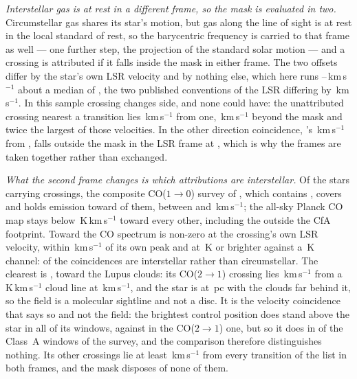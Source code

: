 \emph{Interstellar gas is at rest in a different frame, so the mask is
evaluated in two.} Circumstellar gas shares its star's motion, but gas along
the line of sight is at rest in the local standard of rest, so the
barycentric frequency is carried to that frame as well --- one further step,
the projection of the standard solar motion --- and a crossing is attributed
if it falls inside the mask in either frame. The two offsets differ by the
star's own LSR velocity and by nothing else, which here runs
\LsVLsrLo--\LsVLsrHi\,km\,s$^{-1}$ about a median of \LsVLsrMed, the two
published conventions of the LSR differing by \LsConvKms\,km\,s$^{-1}$.
In this sample \LsNMoveWord{} crossing changes side, and none could have: the unattributed
crossing nearest a transition lies \LsNearestUnattr\,km\,s$^{-1}$ from one,
\LsGapKms\,km\,s$^{-1}$ beyond the mask and twice the largest of those
velocities. In the other direction \LsNLeaveWord{} coincidence,
\LsLeaveStar's \LsLeaveDvStar\,km\,s$^{-1}$ from \LsLeaveLine, falls outside
the mask in the LSR frame at \LsLeaveDvLsr, which is why the frames are
taken together rather than exchanged.

\emph{What the second frame changes is which attributions are interstellar.}
Of the \LsNLos{} stars carrying crossings, the composite CO($1\to0$) survey
of \citet{DameThaddeus2022}, which contains \citet{Dame2001}, covers
\LsNLosCov{} and holds emission toward \LsNLosDet{} of them, between
\LsCoVLo{} and \LsCoVHi\,km\,s$^{-1}$; the all-sky Planck CO map
\citep{PlanckCO2016} stays below \LsPlanckMax\,K\,km\,s$^{-1}$ toward every
other, including the \LsNLosOut{} outside the CfA footprint. Toward
\LsCloudStars{} the CO spectrum is non-zero at the crossing's own LSR
velocity, within \LsCloudDvMax\,km\,s$^{-1}$ of its own peak and at
\LsCloudTMin\,K or brighter against a \LsCoRms\,K channel: \LsNCloud{} of the
\MkNCoinc{} coincidences are interstellar rather than circumstellar. The
clearest is \BkAlmaName, toward the Lupus clouds: its CO($2\to1$) crossing
lies \LsLupDv\,km\,s$^{-1}$ from a \LsLupWco\,K\,km\,s$^{-1}$ cloud line at
\LsLupVco\,km\,s$^{-1}$, and the star is at \BkAlmaDistPc\,pc with the clouds
far behind it, so the field is a molecular sightline and not a disc. It is
the velocity coincidence that says so and not the field: the brightest
control position does stand above the star in all \LsLupNRingLeadWord{} of
its windows, \LsLupTCtrl{} against \LsLupTStar{} in the CO($2\to1$) one, but
so it does in \LsRingLeadA{} of the \NWinA{} Class~A windows of the survey,
and the comparison therefore distinguishes nothing. Its other \LsLupNFar{}
crossings lie at least \LsLupFarMin\,km\,s$^{-1}$ from every transition of
the list in both frames, and the mask disposes of none of them.


